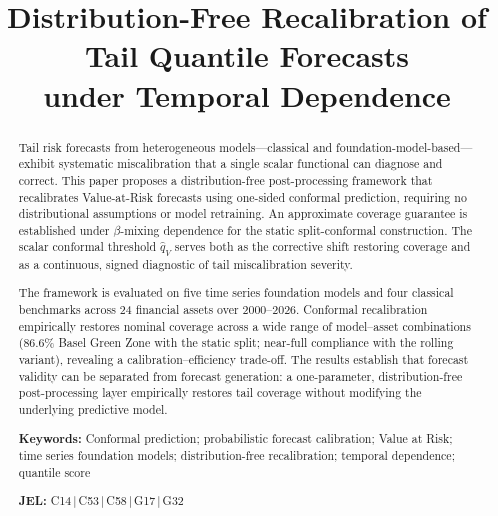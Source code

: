 \documentclass[preprint,11pt,authoryear]{elsarticle}
\newcommand{\1}{\boldsymbol{1}}
\begin{document}
	
	\begin{frontmatter}
		
		\title{Distribution-Free Recalibration of Tail Quantile Forecasts\\
			under Temporal Dependence}
		
		
		\begin{abstract}
			Tail risk forecasts from heterogeneous models---classical and foundation-model-based---exhibit systematic miscalibration that a single scalar functional can diagnose and correct. This paper proposes a distribution-free post-processing framework that recalibrates Value-at-Risk forecasts using one-sided conformal prediction, requiring no distributional assumptions or model retraining. An approximate coverage guarantee is established under $\beta$-mixing dependence for the static split-conformal construction. The scalar conformal threshold $\hat{q}_V$ serves both as the corrective shift restoring coverage and as a continuous, signed diagnostic of tail miscalibration severity.

			The framework is evaluated on five time series foundation models and four classical benchmarks across 24 financial assets over 2000--2026. Conformal recalibration empirically restores nominal coverage across a wide range of model--asset combinations (86.6\% Basel Green Zone with the static split; near-full compliance with the rolling variant), revealing a calibration--efficiency trade-off. The results establish that forecast validity can be separated from forecast generation: a one-parameter, distribution-free post-processing layer empirically restores tail coverage without modifying the underlying predictive model.

			\bigskip\noindent
			\textbf{Keywords:} Conformal prediction; probabilistic forecast calibration; Value at Risk; time series foundation models; distribution-free recalibration; temporal dependence; quantile score

			\bigskip\noindent
			\textbf{JEL:} C14\,|\,C53\,|\,C58\,|\,G17\,|\,G32
		\end{abstract}
		
	\end{frontmatter}
	
\end{document}
